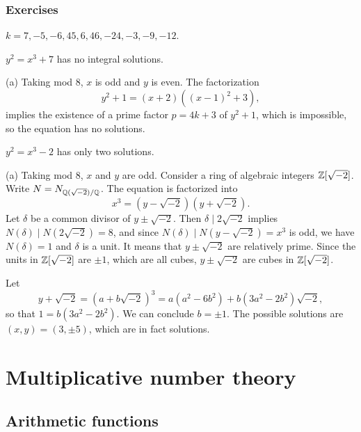 \documentclass{../../large}
\begin{document}
\section*{Exercises}
\begin{prb}
$k=7,-5,-6,45,6,46,-24,-3,-9,-12$.
\begin{parts}
\item $y^2=x^3+7$ has no integral solutions.
\end{parts}
\end{prb}
\begin{pf}
(a)
Taking mod 8, $x$ is odd and $y$ is even.
The factorization
\[y^2+1=(x+2)((x-1)^2+3),\]
implies the existence of a prime factor $p=4k+3$ of $y^2+1$, which is impossible, so the equation has no solutions.
\end{pf}

\begin{prb}
\begin{parts}
\item $y^2=x^3-2$ has only two solutions.
\end{parts}
\end{prb}
\begin{pf}
(a)
Taking mod 8, $x$ and $y$ are odd.
Consider a ring of algebraic integers $\mathbb{Z}[\sqrt{-2}]$.
Write $N=N_{\mathbb{Q}(\sqrt{-2})/\mathbb{Q}}$.
The equation is factorized into
\[x^3=(y-\sqrt{-2})(y+\sqrt{-2}).\]
Let $\delta$ be a common divisor of $y\pm\sqrt{-2}$.
Then $\delta\mid 2\sqrt{-2}$ implies $N(\delta)\mid N(2\sqrt{-2})=8$, and since $N(\delta)\mid N(y-\sqrt{-2})=x^3$ is odd, we have $N(\delta)=1$ and $\delta$ is a unit.
It means that $y\pm\sqrt{-2}$ are relatively prime.
Since the units in $\mathbb{Z}[\sqrt{-2}]$ are $\pm1$, which are all cubes, $y\pm\sqrt{-2}$ are cubes in $\mathbb{Z}[\sqrt{-2}]$.

Let
\[y+\sqrt{-2}=(a+b\sqrt{-2})^3=a(a^2-6b^2)+b(3a^2-2b^2)\sqrt{-2},\]
so that $1=b(3a^2-2b^2)$.
We can conclude $b=\pm1$.
The possible solutions are $(x,y)=(3,\pm5)$, which are in fact solutions.
\end{pf}






\part{Multiplicative number theory}
\chapter{Arithmetic functions}
\end{document}
